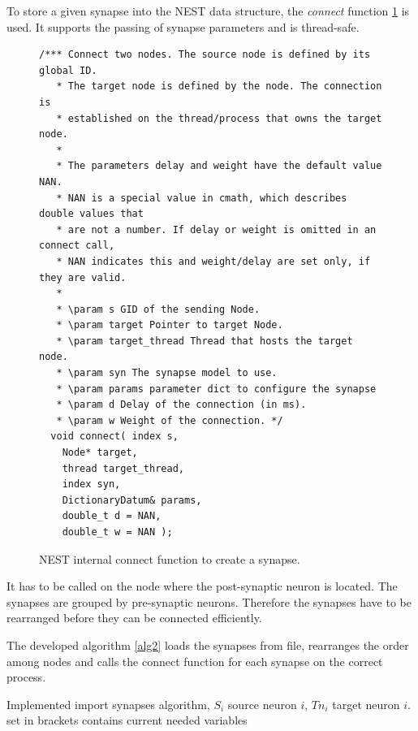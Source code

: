 To store a given synapse into the NEST data structure,
the \emph{connect} function \ref{code:connect} is used.
It supports the passing of synapse parameters and is thread-safe.
\begin{figure}[ht!]
\begin{lstlisting}[style=cppcode]
/*** Connect two nodes. The source node is defined by its global ID.
   * The target node is defined by the node. The connection is
   * established on the thread/process that owns the target node.
   *
   * The parameters delay and weight have the default value NAN.
   * NAN is a special value in cmath, which describes double values that
   * are not a number. If delay or weight is omitted in an connect call,
   * NAN indicates this and weight/delay are set only, if they are valid.
   *
   * \param s GID of the sending Node.
   * \param target Pointer to target Node.
   * \param target_thread Thread that hosts the target node.
   * \param syn The synapse model to use.
   * \param params parameter dict to configure the synapse
   * \param d Delay of the connection (in ms).
   * \param w Weight of the connection. */
  void connect( index s,
    Node* target,
    thread target_thread,
    index syn,
    DictionaryDatum& params,
    double_t d = NAN,
    double_t w = NAN );
\end{lstlisting}
\caption{NEST internal connect function to create a synapse.}
\label{code:connect}
\end{figure}
It has to be called on the node where the post-synaptic neuron is located.
The synapses are grouped by pre-synaptic neurons.
Therefore the synapses have to be rearranged before they can be connected efficiently.

The developed algorithm \ref{alg2} loads the synapses from file, rearranges the order
among nodes and calls the connect function for each synapse on the correct process.
\begin{algorithm}
	\caption{Implemented import synapses algorithm, $S_i$ source neuron $i$, $Tn_i$ target neuron $i$.
	set in brackets contains current needed variables}
\label{alg2}
\end{algorithm}


